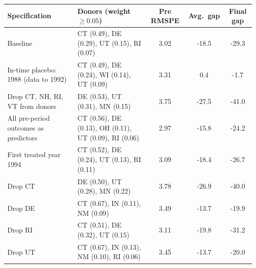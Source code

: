 \begin{tabular}{llccc}
\toprule
Specification & Donors (weight $\geq 0.05$) & Pre RMSPE & Avg.\ gap & Final gap \\
\midrule
Baseline & CT (0.49), DE (0.29), UT (0.15), RI (0.07) & 3.02 & -18.5 & -29.3 \\
In-time placebo: 1988 (data to 1992) & CT (0.49), DE (0.24), WI (0.14), UT (0.09) & 3.31 & 0.4 & -1.7 \\
Drop CT, NH, RI, VT from donors & DE (0.53), UT (0.31), MN (0.15) & 3.75 & -27.5 & -41.0 \\
All pre-period outcomes as predictors & CT (0.56), DE (0.13), OH (0.11), UT (0.09), RI (0.06) & 2.97 & -15.8 & -24.2 \\
First treated year 1994 & CT (0.52), DE (0.24), UT (0.13), RI (0.11) & 3.09 & -18.4 & -26.7 \\
Drop CT & DE (0.50), UT (0.28), MN (0.22) & 3.78 & -26.9 & -40.0 \\
Drop DE & CT (0.67), IN (0.11), NM (0.09) & 3.49 & -13.7 & -19.9 \\
Drop RI & CT (0.51), DE (0.32), UT (0.15) & 3.11 & -19.8 & -31.2 \\
Drop UT & CT (0.67), IN (0.13), NM (0.10), RI (0.06) & 3.45 & -13.7 & -20.0 \\
\bottomrule
\end{tabular}
